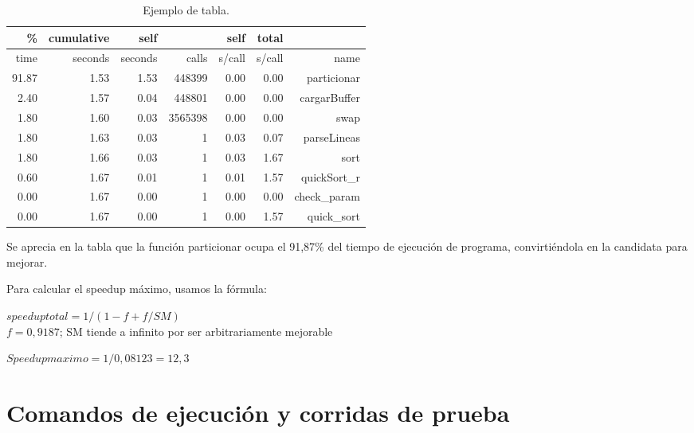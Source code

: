 \documentclass[a4paper,10pt]{article}
\begin{document}
\begin{table}[!htp]
\begin{center}
\begin{tabular}{|r|r|r|r|r|r|r|}
\hline
	\%		&	cumulative  &	self	&			&	self	&	total	& \\
\hline          
	time	&	seconds		&	seconds	&	calls	&	s/call	&	s/call	&	name \\    
\hline
 	91.87	&	1.53		&	1.53	&	448399	&	0.00	&	 0.00	&	particionar \\
\hline
	2.40	&	1.57		&	0.04	&	448801	&	0.00	&	0.00	&	cargarBuffer \\
\hline
	1.80	&	1.60		&	0.03	&	3565398	&	0.00	&	0.00	&	swap \\
\hline
	1.80	&	1.63		&	0.03	&	1		&	0.03	&	0.07	&	parseLineas \\
\hline
	1.80	&	1.66		&	0.03	&	1		&	0.03	&	1.67	&	sort \\
\hline
	0.60	&	1.67		&	0.01	&	1		&	0.01	&	1.57	&	quickSort\_r \\
\hline
	0.00	&	1.67		&	0.00	&	1		&	0.00	&	0.00	&	check\_param \\
\hline
	0.00	&	1.67		&	0.00	&	1		&	0.00	&	1.57	&	quick\_sort \\
\hline
\end{tabular}
\caption{Ejemplo de tabla.} \label{tab002}
\end{center}
\end{table}
 
Se aprecia en la tabla que la funci\'on particionar ocupa el 91,87\% del tiempo de ejecuci\'on de programa, convirti\'endola en la candidata para mejorar.\par
\medskip
Para calcular el speedup m\'aximo, usamos la f\'ormula:

\begin{center}
$ speedup total = 1/(1-f + f/SM)$\\
\vspace{0.5cm}
$ f = 0,9187 $; SM tiende a infinito por ser arbitrariamente mejorable\\

\vspace{0.5cm}

$ Speedup maximo = 1/0,08123 = 12,3$
\end{center}


\newpage

\section{Comandos de ejecuci\'on y corridas de prueba}
\end{document}
